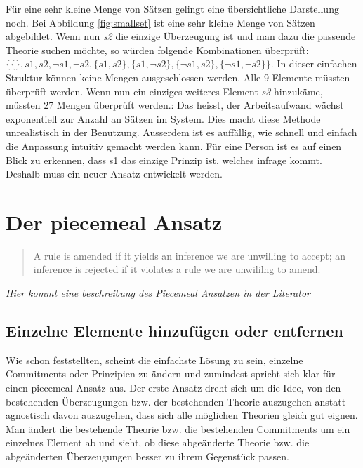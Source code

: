 \documentclass{article}
\begin{document}
Für eine sehr kleine Menge von Sätzen gelingt eine übersichtliche Darstellung noch. Bei Abbildung \ref{fig:smallset} ist eine sehr kleine Menge von Sätzen abgebildet. Wenn nun \textit{s2} die einzige Überzeugung ist und man dazu die passende Theorie suchen möchte, so würden folgende Kombinationen überprüft: $\{\{\}, s1, s2, \neg s1, \neg s2, \{s1,s2\}, \{s1,\neg s2\}, \{\neg s1, s2 \}, \{\neg s1, \neg s2 \} \}$. In dieser einfachen Struktur können keine Mengen ausgeschlossen werden. Alle 9 Elemente müssten überprüft werden. Wenn nun ein einziges weiteres Element \textit{s3} hinzukäme, müssten 27 Mengen überprüft werden.: Das heisst, der Arbeitsaufwand wächst exponentiell zur Anzahl an Sätzen im System. Dies macht diese Methode unrealistisch in der Benutzung. Ausserdem ist es auffällig, wie schnell und einfach die Anpassung intuitiv gemacht werden kann. Für eine Person ist es auf einen Blick zu erkennen, dass s1 das einzige Prinzip ist, welches infrage kommt. Deshalb muss ein neuer Ansatz entwickelt werden.


\section{Der piecemeal Ansatz}
\begin{quote}
    A rule is amended if it yields an inference we are unwilling to accept; an inference is rejected if it violates a rule we are unwililng to amend. \autocite[S.~64]{goodman_fact_1983}
\end{quote}

\textit{Hier kommt eine beschreibung des Piecemeal Ansatzen in der Literator}

\subsection{Einzelne Elemente hinzufügen oder entfernen}
Wie \cite[S.25]{beisbart_making_2015} schon feststellten, scheint die einfachste Lösung zu sein, einzelne Commitments oder Prinzipien zu ändern und zumindest \citeauthor{goodman_fact_1983} spricht sich klar für einen piecemeal-Ansatz aus. Der erste Ansatz dreht sich um die Idee, von den bestehenden Überzeugungen bzw. der bestehenden Theorie auszugehen anstatt agnostisch davon auszugehen, dass sich alle möglichen Theorien gleich gut eignen. Man ändert die bestehende Theorie bzw. die bestehenden Commitments um ein einzelnes Element ab und sieht, ob diese abgeänderte Theorie bzw. die abgeänderten Überzeugungen besser zu ihrem Gegenstück passen.
\end{document}
